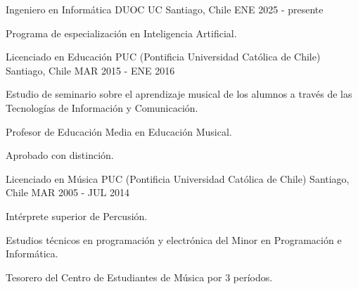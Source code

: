 

\begin{cventries}

  \cventry
    {Ingeniero en Informática} %
    {DUOC UC} %
    {Santiago, Chile} %
    {ENE 2025 - presente} %
    {
      \begin{cvitems} %
        \item {Programa de especialización en Inteligencia Artificial.}
      \end{cvitems}
    }

  \cventry
    {Licenciado en Educación} %
    {PUC (Pontificia Universidad Católica de Chile)} %
    {Santiago, Chile} %
    {MAR 2015 - ENE 2016} %
    {
      \begin{cvitems} %
        \item {Estudio de seminario sobre el aprendizaje musical de los alumnos a través de las Tecnologías de Información y Comunicación.}
        \item {Profesor de Educación Media en Educación Musical.}
        \item {Aprobado con distinción.}
      \end{cvitems}
    }

  \cventry
    {Licenciado en Música} %
    {PUC (Pontificia Universidad Católica de Chile)} %
    {Santiago, Chile} %
    {MAR 2005 - JUL 2014} %
    {
      \begin{cvitems} %
        \item {Intérprete superior de Percusión.}
        \item {Estudios técnicos en programación y electrónica del Minor en Programación e Informática.}
        \item {Tesorero del Centro de Estudiantes de Música por 3 períodos.}
      \end{cvitems}
    }

\end{cventries}
